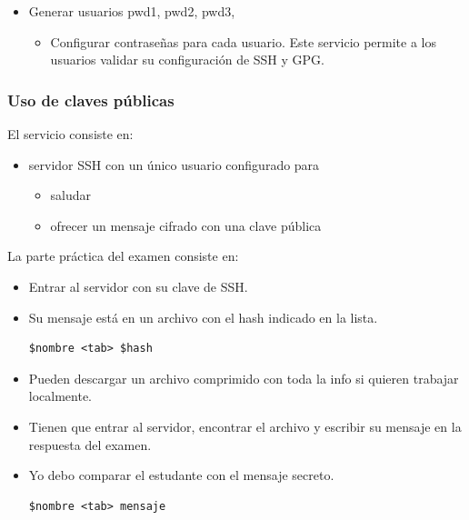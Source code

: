 \documentclass[
  12,
]{scrartcl}
\DeclareRobustCommand{\href}[2]{#2\footnote{\url{#1}}}
\providecommand{\tightlist}{%
  \setlength{\itemsep}{0pt}\setlength{\parskip}{0pt}}
\begin{document}
\begin{itemize}
\begin{itemize}
    Podrían cifrarse y descifrarse con:

    \begin{itemize}
    \item
      \href{https://askubuntu.com/questions/60712/how-do-i-quickly-encrypt-a-file-with-aes\#60713}{aescrypt}
      que \href{https://www.aescrypt.com/download/}{puede descargarse
      para cualquier SO}
    \item
      \href{https://askubuntu.com/a/60713}{openssl} que podría estar
      instalado directamente en el equipo.
    \end{itemize}
  \end{itemize}
\item
  Generar usuarios pwd1, pwd2, pwd3,

  \begin{itemize}
  \tightlist
  \item
    Configurar contraseñas para cada usuario. Este servicio permite a
    los usuarios validar su configuración de SSH y GPG.
  \end{itemize}
\end{itemize}

\hypertarget{uso-de-claves-puxfablicas}{%
\subsubsection{Uso de claves públicas}\label{uso-de-claves-puxfablicas}}

El servicio consiste en:

\begin{itemize}
\tightlist
\item
  servidor SSH con un único usuario configurado para

  \begin{itemize}
  \tightlist
  \item
    saludar
  \item
    ofrecer un mensaje cifrado con una clave pública
  \end{itemize}
\end{itemize}

La parte práctica del examen consiste en:

\begin{itemize}
\item
  Entrar al servidor con su clave de SSH.
\item
  Su mensaje está en un archivo con el hash indicado en la lista.

\begin{verbatim}
$nombre <tab> $hash
\end{verbatim}
\item
  Pueden descargar un archivo comprimido con toda la info si quieren
  trabajar localmente.
\item
  Tienen que entrar al servidor, encontrar el archivo y escribir su
  mensaje en la respuesta del examen.
\item
  Yo debo comparar el estudante con el mensaje secreto.

\begin{verbatim}
$nombre <tab> mensaje
\end{verbatim}
\end{itemize}
\end{document}
